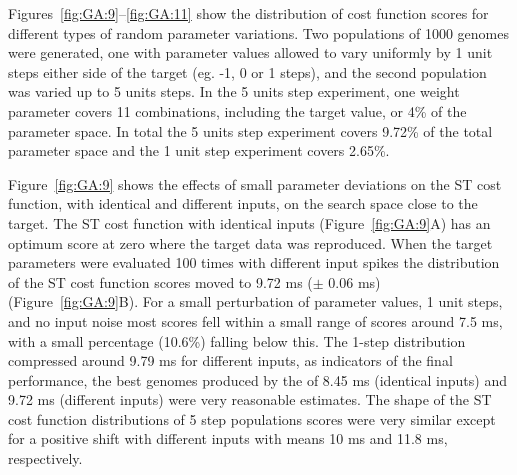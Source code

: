 





Figures~\ref{fig:GA:9}--\ref{fig:GA:11} show the distribution of cost function
scores for different types of random parameter variations. Two
populations of 1000 genomes were generated, one with parameter values
allowed to vary uniformly by 1 unit steps either side of the target
(eg. -1, 0 or 1 steps), and the second population was varied up to 5
units steps.  In the 5 units step experiment, one weight parameter
covers 11 combinations, including the target value, or 4\% of the
parameter space. In total the 5 units step experiment covers 9.72\% of
the total parameter space and the 1 unit step experiment covers
2.65\%.

\smallskip{}

Figure~\ref{fig:GA:9} shows the effects of small parameter deviations
on the ST cost function, with identical and different {\ANF} inputs, on
the search space close to the target. The ST cost function with
identical {\ANF} inputs (Figure~\ref{fig:GA:9}A) has an optimum score at zero where
the target data was reproduced. When the target parameters were
evaluated 100 times with different {\ANF} input spikes the distribution
of the ST cost function scores moved to 9.72 ms ($\pm$ 0.06 ms)
(Figure~\ref{fig:GA:9}B). For a small perturbation of parameter values, 1 unit
steps, and no input noise most scores fell within a small range of
scores around 7.5 ms, with a small percentage (10.6\%) falling below
this. The 1-step distribution compressed around 9.79 ms for different
inputs, as indicators of the {\GAs} final performance, the best genomes
produced by the {\GA} of 8.45 ms (identical inputs) and 9.72 ms
(different inputs) were very reasonable estimates.  The shape of the
ST cost function distributions of 5 step populations scores were very
similar except for a positive shift with different inputs with means
10 ms and 11.8 ms, respectively.

